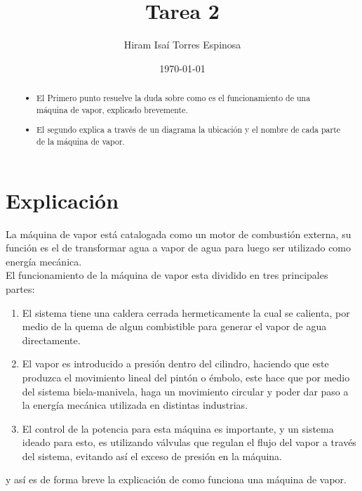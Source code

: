 \documentclass[12pt, letterpaper]{article}
\title{Tarea 2}
\author{Hiram Isaí Torres Espinosa}
\date{\today}
\begin{document}
    \begin{titlepage}
        \maketitle
    \end{titlepage}


    \begin{abstract}
        \begin{itemize}
            \item El Primero punto resuelve la duda sobre como es el funcionamiento de una máquina de vapor, explicado brevemente.  
            \item El segundo explica a través de un diagrama la ubicación y el nombre de cada parte de la máquina de vapor. 
        \end{itemize}
        
    \end{abstract}


    \section{Explicación}
        La máquina de vapor está catalogada como un motor de combustión externa, su función es el de transformar agua a vapor de agua para luego ser utilizado como energía mecánica.
        \\ El funcionamiento de la máquina de vapor esta dividido en tres principales partes: \\
        \begin{enumerate}
            \item El sistema tiene una caldera cerrada hermeticamente la cual se calienta, por medio de la quema de algun combistible para generar el vapor de agua directamente.
            \item El vapor es introducido a presión dentro del cilindro, haciendo que este produzca el movimiento lineal del pintón o émbolo, este hace que por medio del sistema biela-manivela, haga un movimiento circular y poder dar paso a la energía mecánica utilizada en distintas industrias. 
            \item El control de la potencia para esta máquina es importante, y un sistema ideado para esto, es utilizando válvulas que regulan el flujo del vapor a través del sistema, evitando así el exceso de presión en la máquina.  
        \end{enumerate}
        y así es de forma breve la explicación de como funciona una máquina de vapor. 
       
\end{document}
